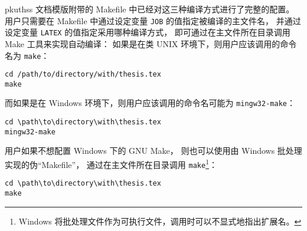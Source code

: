 pkuthss 文档模版附带的 Makefile 中已经对这三种编译方式进行了完整的配置。
用户只需要在 Makefile 中通过设定变量 \verb|JOB| 的值指定被编译的主文件名，
并通过设定变量 \verb|LATEX| 的值指定采用哪种编译方式，
即可通过在主文件所在目录调用 Make 工具来实现自动编译：
如果是在类 UNIX 环境下，则用户应该调用的命令名为 \verb|make|：
\begin{Verbatim}[frame = single]
cd /path/to/directory/with/thesis.tex
make
\end{Verbatim}
而如果是在 Windows 环境下，则用户应该调用的命令名可能为 \verb|mingw32-make|：
\begin{Verbatim}[frame = single]
cd \path\to\directory\with\thesis.tex
mingw32-make
\end{Verbatim}

用户如果不想配置 Windows 下的 GNU Make，
则也可以使用由 Windows 批处理实现的伪“Makefile”，
通过在主文件所在目录调用 \verb|make|\footnote{%
	Windows 将批处理文件作为可执行文件，调用时可以不显式地指出扩展名。%
}：
\begin{Verbatim}[frame = single]
cd \path\to\directory\with\thesis.tex
make
\end{Verbatim}

